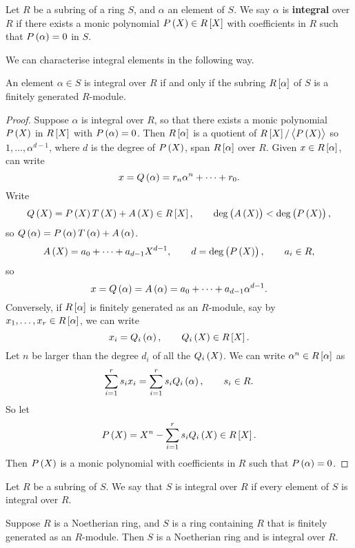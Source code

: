 \begin{definition}
Let $ R $ be a subring of a ring $ S $, and $ \alpha $ an element of $ S $. We say $ \alpha $ is \textbf{integral} over $ R $ if there exists a monic polynomial $ P\br{X} \in R\sbr{X} $ with coefficients in $ R $ such that $ P\br{\alpha} = 0 $ in $ S $.
\end{definition}

We can characterise integral elements in the following way.

\begin{proposition}
An element $ \alpha \in S $ is integral over $ R $ if and only if the subring $ R\sbr{\alpha} $ of $ S $ is a finitely generated $ R $-module.
\end{proposition}

\begin{proof}
Suppose $ \alpha $ is integral over $ R $, so that there exists a monic polynomial $ P\br{X} $ in $ R\sbr{X} $ with $ P\br{\alpha} = 0 $. Then $ R\sbr{\alpha} $ is a quotient of $ R\sbr{X} / \abr{P\br{X}} $ so $ 1, \dots, \alpha^{d - 1} $, where $ d $ is the degree of $ P\br{X} $, span $ R\sbr{\alpha} $ over $ R $. Given $ x \in R\sbr{\alpha} $, can write
$$ x = Q\br{\alpha} = r_n\alpha^n + \dots + r_0. $$
Write
$$ Q\br{X} = P\br{X}T\br{X} + A\br{X} \in R\sbr{X}, \qquad \deg\br{A\br{X}} < \deg\br{P\br{X}}, $$
so $ Q\br{\alpha} = P\br{\alpha}T\br{\alpha} + A\br{\alpha} $.
$$ A\br{X} = a_0 + \dots + a_{d - 1}X^{d - 1}, \qquad d = \deg\br{P\br{X}}, \qquad a_i \in R, $$
so
$$ x = Q\br{\alpha} = A\br{\alpha} = a_0 + \dots + a_{d - 1}\alpha^{d - 1}. $$
Conversely, if $ R\sbr{\alpha} $ is finitely generated as an $ R $-module, say by $ x_1, \dots, x_r \in R\sbr{\alpha} $, we can write
$$ x_i = Q_i\br{\alpha}, \qquad Q_i\br{X} \in R\sbr{X}. $$
Let $ n $ be larger than the degree $ d_i $ of all the $ Q_i\br{X} $. We can write $ \alpha^n \in R\sbr{\alpha} $ as
$$ \sum_{i = 1}^r s_ix_i = \sum_{i = 1}^r s_iQ_i\br{\alpha}, \qquad s_i \in R. $$
So let
$$ P\br{X} = X^n - \sum_{i = 1}^r s_iQ_i\br{X} \in R\sbr{X}. $$
Then $ P\br{X} $ is a monic polynomial with coefficients in $ R $ such that $ P\br{\alpha} = 0 $.
\end{proof}

\begin{definition}
Let $ R $ be a subring of $ S $. We say that $ S $ is integral over $ R $ if every element of $ S $ is integral over $ R $.
\end{definition}

\begin{proposition}
Suppose $ R $ is a Noetherian ring, and $ S $ is a ring containing $ R $ that is finitely generated as an $ R $-module. Then $ S $ is a Noetherian ring and is integral over $ R $.
\end{proposition}

